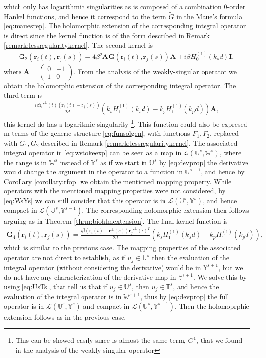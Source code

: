 \documentclass{article}
\newcommand{\IU}{{\mathbb U}}
\newcommand{\IT}{{\mathbb T}}
\newcommand{\IW}{{\mathbb W}}
\newcommand{\IY}{{\mathbb Y}}
\newcommand{\br}{\bm{r}}
\begin{document}
which only has  logarithmic singularities as is composed of a combination 0-order Hankel functions, and hence it correspond to the term $\widetilde{G}$ in the Maue's formula \eqref{eq:mauesrep}. The holomorphic extension of the corresponding integral operator is direct since the kernel function is of the form described in Remark \ref{remark:lessregularitykernel}. The second kernel is 
\begin{align*}
\mathbf{G}_2(\br_i(t),\br_j(s))=
4\beta^2 \mathbf{A}\mathbf{G}(\br_i(t),\br_j(s)) \mathbf{A} + i \beta H_0^{(1)}(k_s d)\mathbf{I},
\end{align*}
where $\mathbf{A} = \begin{pmatrix}
0&-1\\1&0
\end{pmatrix}$. From the analysis of the weakly-singular operator we obtain the holomorphic extension of the corresponding integral operator. The third term is
\begin{align*}
\frac{i \beta \br_i'^\perp(t)(\br_i(t)-\br_j(s))}{2d}  \left(
k_s H^{(1)}_1(k_s d)  -
 k_p H^{(1)}_1(k_p d) 
\right)\mathbf{A},
\end{align*}
this kernel do has a logaritmic singularity \footnote{This can be showed easily since is almost the same term, $G^1$, that we found in the analysis of the weakly-singular operator}. This function could also be expresed in terms of the generic structure \eqref{eq:funsolgen}, with functions $F_1,F_2$, replaced with $G_1,G_2$ described in Remark \ref{remark:lessregularitykernel}. The associated integral operator in \eqref{eq:wstokeexp} can be seen as a map in $\mathcal{L}\left( \IU^s,\IW^s \right)$, where the range is in $\IW^s$ instead of $\IY^s$ as if we start in $\IU^s$ by \eqref{eq:devprop} the derivative would change the argument in the operator to a function in $\IU^{s-1}$, and hence by Corollary \ref{corollary:rfop} we obtain the mentioned mapping property. While operators with the mentioned mapping properties were not considered, by \eqref{eq:WsYs} we can still consider that this operator is in $\mathcal{L}\left(\IU^s,\IY^s \right)$, and hence compact in  $\mathcal{L}\left(\IU^s,\IY^{s-1} \right)$. The corresponding holomorphic extension then follows  arguing as in Theorem \ref{thrm:biohlmextension}. The final kernel function is   
\begin{align*}
\mathbf{G}_4(\br_i(t),\br_j(s)) = \frac{i\beta (\br_i(t)-\br^\perp(s))\br_j'^\perp(s)^T}{2d}
\left(
k_s H^{(1)}_1(k_s d)  -
k_p H^{(1)}_1(k_p d)
\right),
\end{align*}
which is similar to the previous case. The mapping properties of the associated operator are not direct to establish, as if $u_j \in \IU^s$ then the evaluation of the integral operator (without considering the derivative) would be in $\IY^{s+1}$, but we do not have any characterization of the derivative map in $\IY^{s+1}$. We solve this by using \eqref{eq:UsTs}, that tell us that if $u_j \in \IU^s$, then $u_j \in \IT^s$, and hence the evaluation of the integral operator is in $\IW^{s+1}$, thus by \eqref{eq:devprop} the full operator is in $\mathcal{L}\left(\IU^s,\IY^s\right)$ and compact in $\mathcal{L}\left(\IU^s,\IY^{s-1}\right)$. Then the holomoprphic extension follows as in the previous case. 
\end{document}
